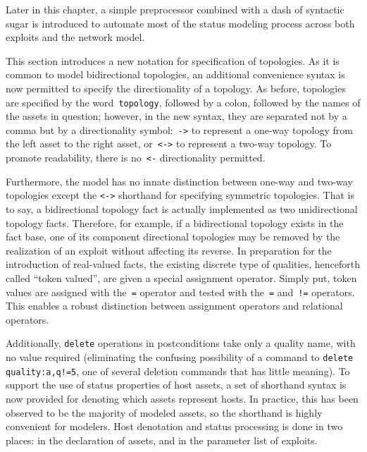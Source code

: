 Later in this chapter, a simple preprocessor combined with a dash of syntactic sugar
is introduced to automate most of the status modeling process across both exploits
and the network model.

This section introduces a new notation for specification of topologies. As it
is common to model bidirectional topologies, an additional convenience syntax
is now permitted to specify the directionality of a topology. As before, 
topologies are specified by the word~\texttt{topology}, followed by a colon, 
followed by the names of the assets in question; however, in the new syntax,
they are separated not by a comma but by a directionality symbol:~\texttt{->} to 
represent a one-way topology from the left asset to the right asset,
or~\texttt{<->} to represent a two-way topology. To promote readability, there
is no~\texttt{<-} directionality permitted.

Furthermore, the model has no innate distinction between one-way and two-way
topologies except the \texttt{<->} shorthand for specifying symmetric topologies.
That is to say, a bidirectional topology fact is actually implemented as
two unidirectional topology facts. Therefore, for example, if a bidirectional
topology exists in the fact base, one of its component directional topologies may
be removed by the realization of an exploit without affecting its reverse.
In preparation for the introduction of real-valued facts, the existing discrete
type of qualities, henceforth called ``token valued'', are given a special
assignment operator. Simply put, token values are assigned with the~\texttt{=}
operator and tested with the~\texttt{=} and~\texttt{!=} operators. This
enables a robust distinction between assignment operators and relational
operators.

Additionally, \texttt{delete} operations in postconditions take only a quality
name, with no value required (eliminating the confusing possibility of a
command to \texttt{delete quality:a,q!=5}, one of several deletion commands
that has little meaning).
To support the use of status properties of host assets, a set of shorthand
syntax is now provided for denoting which assets represent hosts. In practice,
this has been observed to be the majority of modeled assets, so the shorthand
is highly convenient for modelers. Host denotation and status processing is 
done in two places: in the declaration of assets, and in the parameter list of 
exploits.

